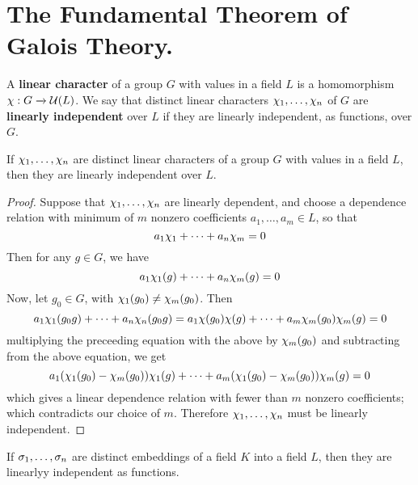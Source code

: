 \section{The Fundamental Theorem of Galois Theory.}

\begin{definition}
    A \textbf{linear character} of a group $G$ with values in a field  $L$ is a
    homomorphism  $\chi:G \xrightarrow{} \mathcal{U}(L)$. We say that distinct linear
    characters $\chi_1, \dots, \chi_n$ of $G$ are  \textbf{linearly independent}
    over $L$ if they are linearly independent, as functions, over  $G$.
\end{definition}

\begin{theorem}\label{2.2.1}
    If $\chi_1, \dots, \chi_n$ are distinct linear characters of a group $G$ with
    values in a field  $L$, then they are linearly independent over  $L$.
\end{theorem}
\begin{proof}
    Suppose that $\chi_1, \dots, \chi_n$ are linearly dependent, and choose a
    dependence relation with minimum of $m$ nonzero coefficients $a_1, \dots,
    a_m \in L$, so that
    \begin{equation*}
        a_1\chi_1+\dots+a_n\chi_m=0
    \end{equation*}
    Then for any $g \in G$, we have
    \begin{equation*}
        a_1\chi_1(g)+\dots+a_n\chi_m(g)=0
    \end{equation*}
    Now, let $g_0 \in G$, with $\chi_1(g_0) \neq \chi_m(g_0)$. Then
    \begin{equation*}
        a_1\chi_1(g_0g)+\dots+a_n\chi_n(g_0g)=a_1\chi(g_0)\chi(g)+\dots+a_m\chi_m(g_0)\chi_m(g)=0
    \end{equation*}
    multiplying the preceeding equation with the above by $\chi_m(g_0)$ and
    subtracting from the above equation, we get
    \begin{equation*}
        a_1(\chi_1(g_0)-\chi_m(g_0))\chi_1(g)+\dots+a_m(\chi_1(g_0)-\chi_m(g_0))\chi_m(g)=0
    \end{equation*}
    which gives a linear dependence relation with fewer than $m$ nonzero
    coefficients; which contradicts our choice of  $m$. Therefore  $\chi_1, \dots,
    \chi_n$ must be linearly independent.
\end{proof}
\begin{corollary}
    If $\sigma_1, \dots, \sigma_n$ are distinct embeddings of a field $K$ into a field
    $L$, then they are linearlyy independent as functions.
\end{corollary}

